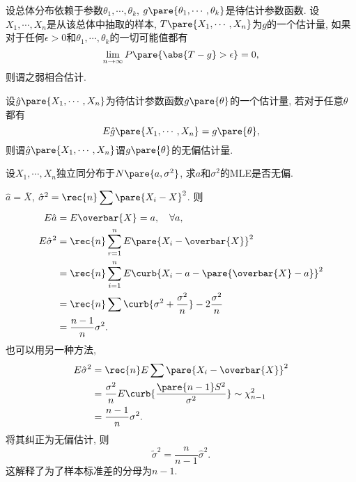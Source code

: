 \documentclass{ctexart}
\begin{document}
设总体分布依赖于参数$\theta_1,\cdots,\theta_k$, $g\pare{\theta_1,\cdots,\theta_k}$是待估计参数函数. 设$X_1,\cdots,X_n$是从该总体中抽取的样本, $T\pare{X_1,\cdots,X_n}$为$g$的一个估计量, 如果对于任何$\epsilon>0$和$\theta_1,\cdots,\theta_k$的一切可能值都有
\[ \lim_{n\rightarrow \infty} P\pare{\abs{T-g}>\epsilon} = 0, \]
则谓之弱相合估计.
\par
设$\hat{g}\pare{X_1,\cdots,X_n}$为待估计参数函数$g\pare{\theta}$的一个估计量, 若对于任意$\theta$都有
\[ E\hat{g}\pare{X_1,\cdots,X_n} = g\pare{\theta}, \]
则谓$\hat{g}\pare{X_1,\cdots,X_n}$谓$g\pare{\theta}$的无偏估计量.
\begin{sample}
    \begin{ex}
        设$X_1,\cdots,X_n$独立同分布于$N\pare{a,\sigma^2}$, 求$a$和$\sigma^2$的MLE是否无偏.
    \end{ex}
    \begin{solution}
        $\hat{a} = \overbar{X}$, $\hat\sigma^2 = \displaystyle \rec{n} \sum \pare{X_i - X}^2$. 则
        \begin{align*}
            E\hat{a} &= E\overbar{X} = a,\quad \forall a, \\
            E\hat\sigma^2 &= \rec{n} \sum_{r=1}^n E\pare{X_i - \overbar{X}}^2 \\
            &= \rec{n} \sum_{i=1}^n E\curb{X_i - a - \pare{\overbar{X} - a}}^2 \\
            &= \rec{n} \sum \curb{\sigma^2 + \frac{\sigma^2}{n}} - 2 \frac{\sigma^2}{n} \\
            &= \frac{n-1}{n}\sigma^2.
        \end{align*}
        也可以用另一种方法,
        \begin{align*}
            E\hat{\sigma}^2 &= \rec{n} E\sum \pare{X_i - \overbar{X}}^2 \\
            &= \frac{\sigma^2}{n} E\curb{\frac{\pare{n-1}S^2}{\sigma^2}}\sim \chi_{n-1}^2 \\
            &= \frac{n-1}{n}\sigma^2.
        \end{align*}
        将其纠正为无偏估计, 则
        \[ \tilde{\sigma}^2 = \frac{n}{n-1} \hat{\sigma}^2. \]
        这解释了为了样本标准差的分母为$n-1$.
    \end{solution}
\end{sample}
\end{document}
